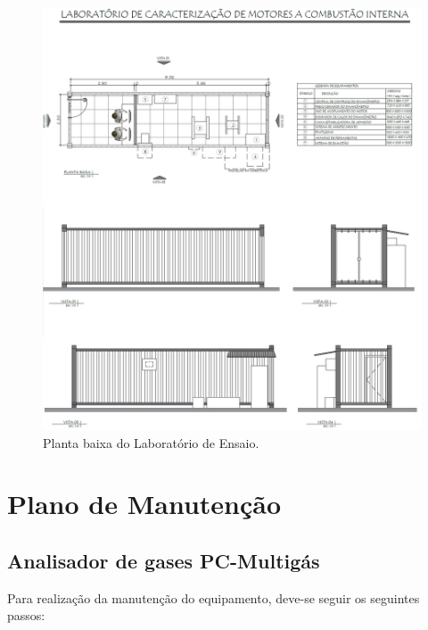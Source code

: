 \begin{anexosenv}
\begin{figure}[h!]
	\centering
	\includegraphics[keepaspectratio=true,scale= 0.4]{figuras/ANEXO.png}
	\caption{Planta baixa do Laboratório de Ensaio.}
	\label{fig:plantabaixa}
\end{figure}

\end{anexosenv}

















\chapter{Plano de Manutenção}
\label{anexoB}

\section{Analisador de gases PC-Multigás}

Para realização da manutenção do equipamento, deve-se seguir os seguintes passos:

